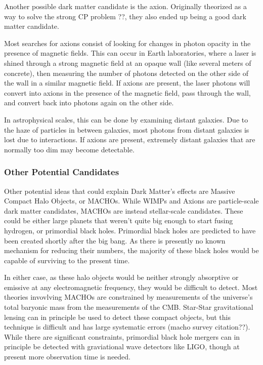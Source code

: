 Another possible dark matter candidate is the axion.
Originally theorized as a way to solve the strong CP problem ??, they also ended up being a good dark matter candidate.

Most searches for axions consist of looking for changes in photon opacity in the presence of magnetic fields.
This can occur in Earth laboratories, where a laser is shined through a strong magnetic field at an opaque wall (like several meters of concrete), then measuring the number of photons detected on the other side of the wall in a similar magnetic field.
If axions are present, the laser photons will convert into axions in the presence of the magnetic field, pass through the wall, and convert back into photons again on the other side.

In astrophysical scales, this can be done by examining distant galaxies.
Due to the haze of particles in between galaxies, most photons from distant galaxies is lost due to interactions.
If axions are present, extremely distant galaxies that are normally too dim may become detectable.


\subsubsection{Other Potential Candidates}

Other potential ideas that could explain Dark Matter's effects are Massive Compact Halo Objects, or MACHOs.
While WIMPs and Axions are particle-scale dark matter candidates, MACHOs are instead stellar-scale candidates.
These could be either large planets that weren't quite big enough to start fusing hydrogen, or primordial black holes.
Primordial black holes are predicted to have been created shortly after the big bang.
As there is presently no known mechanism for reducing their numbers, the majority of these black holes would be capable of surviving to the present time.

In either case, as these halo objects would be neither strongly absorptive or emissive at any electromagnetic frequency, they would be difficult to detect.
Most theories invovlving MACHOs are constrained by measurements of the universe's total baryonic mass from the measurements of the CMB.
Star-Star gravitational lensing can in principle be used to detect these compact objects, but this technique is difficult and has large systematic errors (macho survey citation??).
While there are significant constraints\cite{pbh_highly_constrained}, primordial black hole mergers can in principle be detected with graviational wave detectors like LIGO\cite{dm_with_ligo}, though at present more observation time is needed.



